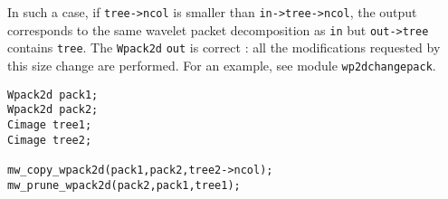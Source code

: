 In such a case, if \verb+tree->ncol+ is smaller than  \verb+in->tree->ncol+, the
output corresponds to the same wavelet packet decomposition as \verb+in+ but
\verb+out->tree+ contains \verb+tree+. The \verb+Wpack2d+ \verb+out+ is correct :
 all the modifications requested by this size change are performed. 
For an example, see module \verb+wp2dchangepack+.

\Next
\Example

\begin{verbatim}
Wpack2d pack1;
Wpack2d pack2;
Cimage tree1;
Cimage tree2;

mw_copy_wpack2d(pack1,pack2,tree2->ncol);
mw_prune_wpack2d(pack2,pack1,tree1);
\end{verbatim}

\newpage %

